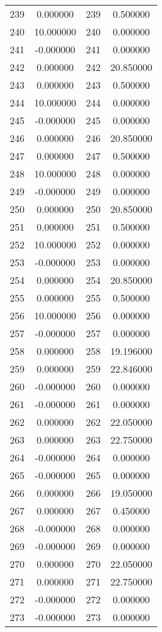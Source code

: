 \documentclass[12pt]{article}
\begin{document}
\begin{longtable}{@{}cccc@{}}
239 & 0.000000 & 239 & 0.500000 \\
240 & 10.000000 & 240 & 0.000000 \\
241 & -0.000000 & 241 & 0.000000 \\
242 & 0.000000 & 242 & 20.850000 \\
243 & 0.000000 & 243 & 0.500000 \\
244 & 10.000000 & 244 & 0.000000 \\
245 & -0.000000 & 245 & 0.000000 \\
246 & 0.000000 & 246 & 20.850000 \\
247 & 0.000000 & 247 & 0.500000 \\
248 & 10.000000 & 248 & 0.000000 \\
249 & -0.000000 & 249 & 0.000000 \\
250 & 0.000000 & 250 & 20.850000 \\
251 & 0.000000 & 251 & 0.500000 \\
252 & 10.000000 & 252 & 0.000000 \\
253 & -0.000000 & 253 & 0.000000 \\
254 & 0.000000 & 254 & 20.850000 \\
255 & 0.000000 & 255 & 0.500000 \\
256 & 10.000000 & 256 & 0.000000 \\
257 & -0.000000 & 257 & 0.000000 \\
258 & 0.000000 & 258 & 19.196000 \\
259 & 0.000000 & 259 & 22.846000 \\
260 & -0.000000 & 260 & 0.000000 \\
261 & -0.000000 & 261 & 0.000000 \\
262 & 0.000000 & 262 & 22.050000 \\
263 & 0.000000 & 263 & 22.750000 \\
264 & -0.000000 & 264 & 0.000000 \\
265 & -0.000000 & 265 & 0.000000 \\
266 & 0.000000 & 266 & 19.050000 \\
267 & 0.000000 & 267 & 0.450000 \\
268 & -0.000000 & 268 & 0.000000 \\
269 & -0.000000 & 269 & 0.000000 \\
270 & 0.000000 & 270 & 22.050000 \\
271 & 0.000000 & 271 & 22.750000 \\
272 & -0.000000 & 272 & 0.000000 \\
273 & -0.000000 & 273 & 0.000000 \\

\end{longtable}
\end{document}
